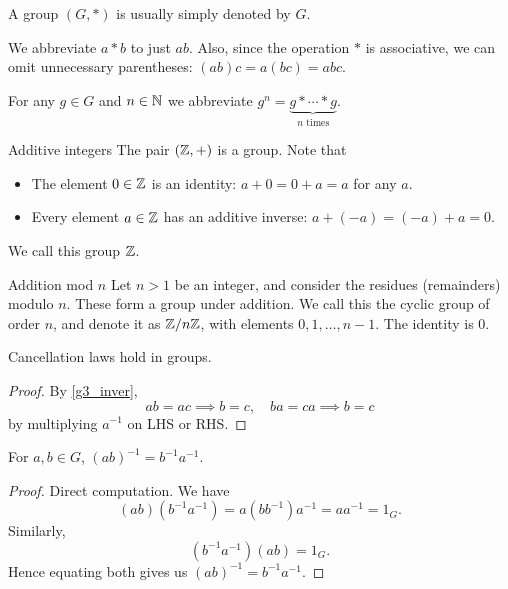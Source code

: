 \begin{notation}
A group $(G,\ast)$ is usually simply denoted by $G$.
\end{notation}

\begin{notation}
We abbreviate $a \ast b$ to just $ab$. Also, since the operation $\ast$ is associative, we can omit unnecessary parentheses: $(ab)c = a(bc) = abc$.
\end{notation}

\begin{notation}
For any $g \in G$ and $n \in \mathbb N$ we abbreviate $g^n = \underbrace{g \ast \cdots \ast g}_{n\text{ times}}$.
\end{notation}

\begin{exmp}{Additive integers}{}
The pair $(\mathbb Z,+)$ is a group. Note that
\begin{itemize}
\item The element $0 \in \mathbb Z$ is an identity: $a+0=0+a=a$ for any $a$.
\item Every element $a \in \mathbb Z$ has an additive inverse: $a+(-a)=(-a)+a=0$.
\end{itemize}
We call this group $\mathbb Z$.
\end{exmp}

\begin{exmp}{Addition mod $n$}{}
Let $n > 1$ be an integer, and consider the residues (remainders) modulo $n$. These form a group under addition. We call this the cyclic group of order $n$, and denote it as $\mathbb Z/n\mathbb Z$, with elements $0, 1, \dots, n-1$. The identity is 0.
\end{exmp}

\begin{proposition}
Cancellation laws hold in groups.
\end{proposition}
\begin{proof}
By \cref{g3_inver},
\[ ab=ac \implies b=c,\quad ba=ca\implies b=c \]
by multiplying $a^{-1}$ on LHS or RHS. 
\end{proof}

\begin{proposition}
For $a,b \in G$, $(ab)^{-1} = b^{-1}a^{-1}$.
\end{proposition}
\begin{proof}
Direct computation. We have
\[ (ab)(b^{-1}a^{-1}) = a(bb^{-1})a^{-1} = aa^{-1} = 1_G. \]
Similarly, 
\[ (b^{-1}a^{-1})(ab) = 1_G. \]
Hence equating both gives us $(ab)^{-1} = b^{-1}a^{-1}$.
\end{proof}

